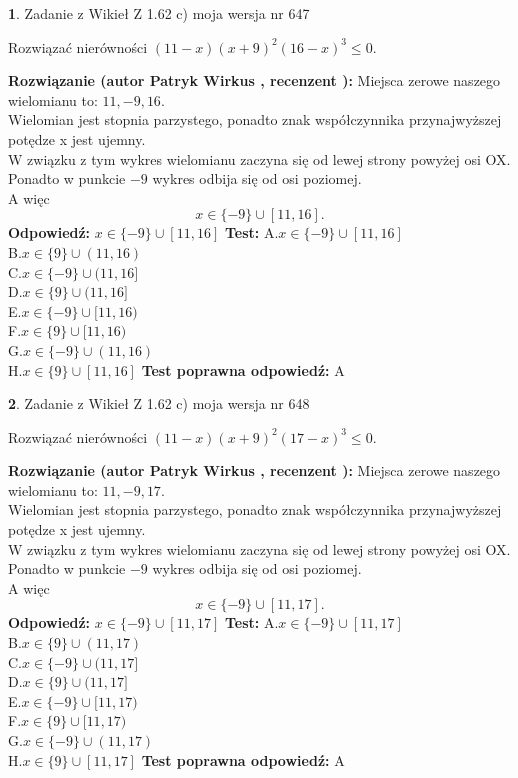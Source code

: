 \documentclass[12pt, a4paper]{article}
\theoremstyle{definition} %
\newtheorem{zad}{}
\newcommand{\zadStart}[1]{\begin{zad}#1\newline}
\newcommand{\zadStop}{\end{zad}}
\newcommand{\rozwStart}[2]{\noindent \textbf{Rozwiązanie (autor #1 , recenzent #2): }\newline}
\newcommand{\rozwStop}{\newline}
\newcommand{\odpStart}{\noindent \textbf{Odpowiedź:}\newline}
\newcommand{\odpStop}{\newline}
\newcommand{\testStart}{\noindent \textbf{Test:}\newline}
\newcommand{\testStop}{\newline}
\newcommand{\kluczStart}{\noindent \textbf{Test poprawna odpowiedź:}\newline}
\newcommand{\kluczStop}{\newline}
\begin{document}
\zadStart{Zadanie z Wikieł Z 1.62 c) moja wersja nr 647}

Rozwiązać nierówności $(11-x)(x+9)^{2}(16-x)^{3}\le0$.
\zadStop
\rozwStart{Patryk Wirkus}{}
Miejsca zerowe naszego wielomianu to: $11, -9, 16$.\\
Wielomian jest stopnia parzystego, ponadto znak współczynnika przy\linebreak najwyższej potędze x jest ujemny.\\ W związku z tym wykres wielomianu zaczyna się od lewej strony powyżej osi OX.\\
Ponadto w punkcie $-9$ wykres odbija się od osi poziomej.\\
A więc $$x \in \{-9\} \cup [11,16].$$
\rozwStop
\odpStart
$x \in \{-9\} \cup [11,16]$
\odpStop
\testStart
A.$x \in \{-9\} \cup [11,16]$\\
B.$x \in \{9\} \cup (11,16)$\\
C.$x \in \{-9\} \cup (11,16]$\\
D.$x \in \{9\} \cup (11,16]$\\
E.$x \in \{-9\} \cup [11,16)$\\
F.$x \in \{9\} \cup [11,16)$\\
G.$x \in \{-9\} \cup (11,16)$\\
H.$x \in \{9\} \cup [11,16]$
\testStop
\kluczStart
A
\kluczStop



\zadStart{Zadanie z Wikieł Z 1.62 c) moja wersja nr 648}

Rozwiązać nierówności $(11-x)(x+9)^{2}(17-x)^{3}\le0$.
\zadStop
\rozwStart{Patryk Wirkus}{}
Miejsca zerowe naszego wielomianu to: $11, -9, 17$.\\
Wielomian jest stopnia parzystego, ponadto znak współczynnika przy\linebreak najwyższej potędze x jest ujemny.\\ W związku z tym wykres wielomianu zaczyna się od lewej strony powyżej osi OX.\\
Ponadto w punkcie $-9$ wykres odbija się od osi poziomej.\\
A więc $$x \in \{-9\} \cup [11,17].$$
\rozwStop
\odpStart
$x \in \{-9\} \cup [11,17]$
\odpStop
\testStart
A.$x \in \{-9\} \cup [11,17]$\\
B.$x \in \{9\} \cup (11,17)$\\
C.$x \in \{-9\} \cup (11,17]$\\
D.$x \in \{9\} \cup (11,17]$\\
E.$x \in \{-9\} \cup [11,17)$\\
F.$x \in \{9\} \cup [11,17)$\\
G.$x \in \{-9\} \cup (11,17)$\\
H.$x \in \{9\} \cup [11,17]$
\testStop
\kluczStart
A
\kluczStop
\end{document}
